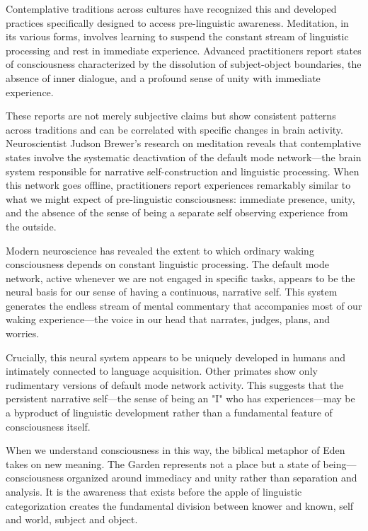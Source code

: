 Contemplative traditions across cultures have recognized this and developed practices specifically designed to access pre-linguistic awareness. Meditation, in its various forms, involves learning to suspend the constant stream of linguistic processing and rest in immediate experience. Advanced practitioners report states of consciousness characterized by the dissolution of subject-object boundaries, the absence of inner dialogue, and a profound sense of unity with immediate experience.

These reports are not merely subjective claims but show consistent patterns across traditions and can be correlated with specific changes in brain activity. Neuroscientist Judson Brewer's research on meditation reveals that contemplative states involve the systematic deactivation of the default mode network—the brain system responsible for narrative self-construction and linguistic processing. When this network goes offline, practitioners report experiences remarkably similar to what we might expect of pre-linguistic consciousness: immediate presence, unity, and the absence of the sense of being a separate self observing experience from the outside.

Modern neuroscience has revealed the extent to which ordinary waking consciousness depends on constant linguistic processing. The default mode network, active whenever we are not engaged in specific tasks, appears to be the neural basis for our sense of having a continuous, narrative self. This system generates the endless stream of mental commentary that accompanies most of our waking experience—the voice in our head that narrates, judges, plans, and worries.

Crucially, this neural system appears to be uniquely developed in humans and intimately connected to language acquisition. Other primates show only rudimentary versions of default mode network activity. This suggests that the persistent narrative self—the sense of being an "I" who has experiences—may be a byproduct of linguistic development rather than a fundamental feature of consciousness itself.

When we understand consciousness in this way, the biblical metaphor of Eden takes on new meaning. The Garden represents not a place but a state of being—consciousness organized around immediacy and unity rather than separation and analysis. It is the awareness that exists before the apple of linguistic categorization creates the fundamental division between knower and known, self and world, subject and object.

